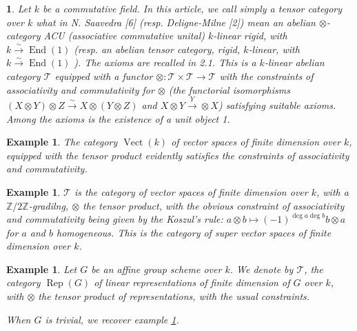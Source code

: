 \documentclass{article}
\newtheorem{env}[term]{}
\newtheorem{example}[term]{Example}
\DeclareMathOperator{\Rep}{\text{Rep}}
\DeclareMathOperator{\End}{\text{End}}
\DeclareMathOperator{\Vect}{\text{Vect}}
\begin{document}
\begin{env}
Let $k$ be a commutative field. In this article, we call simply a tensor category over $k$ what in N. Saavedra [6]
(resp. Deligne-Milne [2]) mean an abelian $\otimes$-category ACU (associative commutative unital) $k$-linear rigid,
with $k \xrightarrow {\sim} \End (1)$ (resp. an abelian tensor category, rigid, $k$-linear, with 
$k \xrightarrow {\sim} \End (1)$ ). The axioms are recalled in 2.1. This is a $k$-linear abelian category
$\mathcal T$ equipped with a functor $\otimes: \mathcal T \times \mathcal T \rightarrow \mathcal T$ with the 
constraints of associativity and commutativity for $\otimes$ (the functorial isomorphisms 
$(X \otimes Y) \otimes Z \xrightarrow{\sim} X \otimes (Y \otimes Z)$ and $X \otimes Y \xrightarrow Y \otimes X$) 
satisfying suitable axioms. Among the axioms is the existence of a unit object 1.
\end{env}

\begin{example}\label{trivial}
The category $\Vect (k)$ of vector spaces of finite dimension over $k$, equipped with the tensor
product evidently satisfies the constraints of associativity and commutativity.
\end{example}

\begin{example}
$\mathcal T$ is the category of vector spaces of finite dimension over $k$, with a 
$\mathbb Z / 2 \mathbb Z$-gradilng, $\otimes$ the tensor product, with the obvious constraint of associativity and
commutativity being given by the Koszul's rule: $a \otimes b \mapsto (-1)^{\deg a \deg b}b \otimes a$ for $a$ and $b$ 
homogeneous.
This is the category of super vector spaces of finite dimension over $k$.
\end{example}

\begin{example}\label{orig_tannaka_duality}
Let $G$ be an affine group scheme over $k$. We denote by $\mathcal T$, the category $\Rep (G)$ of 
linear representations of finite dimension of $G$ over $k$, with $\otimes$ the tensor product of representations,
with the usual constraints.

  When $G$ is trivial, we recover example \ref{trivial}.
\end{example}
\end{document}
